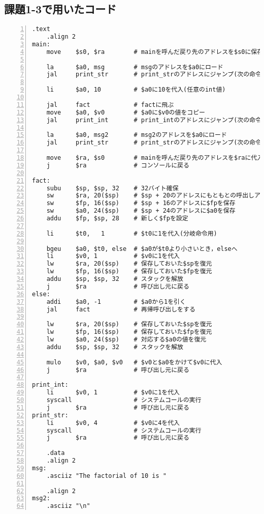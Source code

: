 \subsection{課題1-3で用いたコード} \label{sec:p1-3}
\begin{Verbatim}[numbers=left, xleftmargin=10mm, numbersep=6pt,
                    fontsize=\small, baselinestretch=0.8]
    .text
    .align 2
main:
    move    $s0, $ra        # mainを呼んだ戻り先のアドレスを$s0に保存しておく

    la      $a0, msg        # msgのアドレスを$a0にロード
    jal     print_str       # print_strのアドレスにジャンプ(次の命令のアドレスを$raに)

    li      $a0, 10         # $a0に10を代入(任意のint値)

    jal     fact            # factに飛ぶ
    move    $a0, $v0        # $a0に$v0の値をコピー
    jal     print_int       # print_intのアドレスにジャンプ(次の命令のアドレスを$raに)

    la      $a0, msg2       # msg2のアドレスを$a0にロード
    jal     print_str       # print_strのアドレスにジャンプ(次の命令のアドレスを$raに)

    move    $ra, $s0        # mainを呼んだ戻り先のアドレスを$raに代入
    j       $ra             # コンソールに戻る

fact:
    subu    $sp, $sp, 32    # 32バイト確保
    sw      $ra, 20($sp)    # $sp + 20のアドレスにもともとの呼出しアドレスを保存
    sw      $fp, 16($sp)    # $sp + 16のアドレスに$fpを保存
    sw      $a0, 24($sp)    # $sp + 24のアドレスに$a0を保存
    addu    $fp, $sp, 28    # 新しく$fpを設定

    li      $t0,   1        # $t0に1を代入(分岐命令用)

    bgeu    $a0, $t0, else  # $a0が$t0より小さいとき，elseへ
    li      $v0, 1          # $v0に1を代入
    lw      $ra, 20($sp)    # 保存しておいた$spを復元
    lw      $fp, 16($sp)    # 保存しておいた$fpを復元
    addu    $sp, $sp, 32    # スタックを解放
    j       $ra             # 呼び出し元に戻る
else:
    addi    $a0, -1         # $a0から1を引く
    jal     fact            # 再帰呼び出しをする

    lw      $ra, 20($sp)    # 保存しておいた$spを復元
    lw      $fp, 16($sp)    # 保存しておいた$fpを復元
    lw      $a0, 24($sp)    # 対応する$a0の値を復元
    addu    $sp, $sp, 32    # スタックを解放

    mulo    $v0, $a0, $v0   # $v0と$a0をかけて$v0に代入
    j       $ra             # 呼び出し元に戻る

print_int:
    li      $v0, 1          # $v0に1を代入
    syscall                 # システムコールの実行
    j       $ra             # 呼び出し元に戻る
print_str:
    li      $v0, 4          # $v0に4を代入
    syscall                 # システムコールの実行
    j       $ra             # 呼び出し元に戻る

    .data
    .align 2
msg:
    .asciiz "The factorial of 10 is "

    .align 2
msg2:
    .asciiz "\n"
\end{Verbatim}

